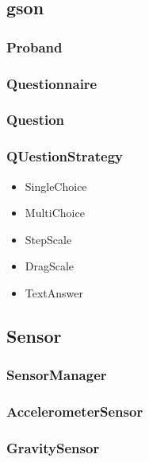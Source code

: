 \documentclass[a4paper]{scrreprt}
\begin{document}
            \subsection{gson}

                \subsubsection{Proband}

                \subsubsection{Questionnaire}

                \subsubsection{Question}

                \subsubsection{QUestionStrategy} %
                    \begin{itemize}
                        \item SingleChoice
                        \item MultiChoice
                        \item StepScale
                        \item DragScale
                        \item TextAnswer
                    \end{itemize}

            \subsection{Sensor}

                \subsubsection{SensorManager}
                \subsubsection{AccelerometerSensor}
                \subsubsection{GravitySensor}
\end{document}
